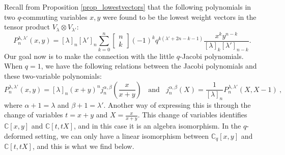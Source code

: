 \documentclass[a4paper,12pt]{article}
\numberwithin{equation}{section}
\newcommand{\C}{\mathbb{C}}
\newcommand{\qbinom}[2]{\begin{bmatrix}#1\\#2\end{bmatrix}}
\theoremstyle{rem}
\newenvironment{rema}
  {\pushQED{\qed}\renewcommand{\qedsymbol}{$\scriptstyle{\blacktriangle}$}\remax}
  {\popQED\endremax}
\theoremstyle{definition}
\begin{document}
Recall from Proposition \ref{prop_lowestvectors} that the following polynomials in two $q$-commuting variables $x,y$  were found to be the lowest weight vectors in the tensor product $V_{\lambda}\otimes V_{\lambda'}$:
\begin{equation}
P_n^{\lambda,\lambda'}(x,y)=[\lambda]_n[\lambda']_n \sum_{k=0}^n \qbinom{n}{k}(-1)^k  q^{k(\lambda'+2n-k-1)}\frac{x^ky^{n-k}}{[\lambda]_k[\lambda']_{n-k}}.
\end{equation}
Our goal now is to make the connection with the little $q$-Jacobi polynomials.
\begin{rema}
When $q=1$, we have the following relations between the Jacobi polynomials and these two-variable polynomials:
\begin{equation}\label{classicalrel_PJ}
P^{\lambda,\lambda'}_n(x,y)=[\lambda]_n(x+y)^nj^{\alpha,\beta}_n\left(\frac{x}{x+y}\right)\ \ \ \ \text{and}\ \ \ \ j^{\alpha,\beta}_n(X)=\frac{1}{[\lambda]_n}P^{\lambda,\lambda'}_n(X,X-1)\ ,
\end{equation}
where $\alpha+1=\lambda$ and $\beta+1=\lambda'$. Another way of expressing this is through the change of variables $t=x+y$ and $X=\frac{x}{x+y}$. This change of variables identifies $\C[x,y]$ and $\C[t,tX]$, and in this case it is an algebra isomorphism. In the $q$-deformed setting, we can only have a linear isomorphism between $\C_q[x,y]$ and $\C[t,tX]$, and this is what we find below.
\end{rema}
\end{document}
